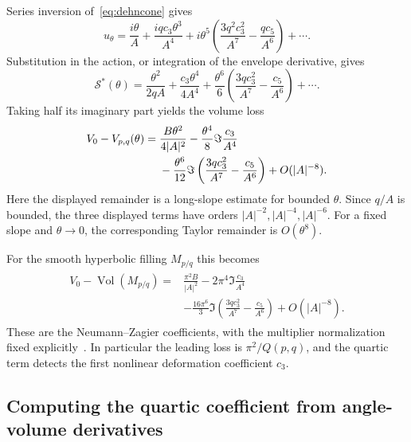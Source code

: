 \documentclass[11pt,a4paper]{article}
\numberwithin{equation}{section}
\theoremstyle{definition}
\theoremstyle{remark}
\DeclareMathOperator{\Vol}{Vol}
\begin{document}
Series inversion of~\eqref{eq:dehncone} gives
\begin{equation}
 u_\theta=\frac{i\theta}{A}
   +\frac{iqc_3\theta^3}{A^4}
   +i\theta^5\left(\frac{3q^2c_3^2}{A^7}
                         -\frac{qc_5}{A^6}\right)+\cdots.
 \label{eq:dehninversion}
\end{equation}
Substitution in the action, or integration of the envelope derivative,
gives
\begin{equation}
 \mathcal S^*(\theta)=\frac{\theta^2}{2qA}
  +\frac{c_3\theta^4}{4A^4}
  +\frac{\theta^6}{6}
       \left(\frac{3qc_3^2}{A^7}-\frac{c_5}{A^6}\right)+\cdots.
 \label{eq:dehncriticalseries}
\end{equation}
Taking half its imaginary part yields the volume loss
\begin{align}
 V_0-V_{p,q}(\theta)
 ={}&\frac{B\theta^2}{4|A|^2}
       -\frac{\theta^4}{8}\Im\frac{c_3}{A^4}\notag\\
    &-\frac{\theta^6}{12}
       \Im\left(\frac{3qc_3^2}{A^7}-\frac{c_5}{A^6}\right)
       +O(|A|^{-8}).
 \label{eq:dehnconeloss}
\end{align}
Here the displayed remainder is a long-slope estimate for bounded
$\theta$. Since $q/A$ is bounded, the three displayed terms have
orders $|A|^{-2},|A|^{-4},|A|^{-6}$. For a fixed slope and
$\theta\to0$, the corresponding Taylor remainder is $O(\theta^8)$.

For the smooth hyperbolic filling $M_{p/q}$ this becomes
\begin{align}
 \boxed{\begin{aligned}
 V_0-\Vol(M_{p/q})
 ={}&\frac{\pi^2B}{|A|^2}
       -2\pi^4\Im\frac{c_3}{A^4}\\
    &-\frac{16\pi^6}{3}
       \Im\left(\frac{3qc_3^2}{A^7}-\frac{c_5}{A^6}\right)
       +O(|A|^{-8}).
 \end{aligned}}
 \label{eq:dehnsmoothloss}
\end{align}
These are the Neumann--Zagier coefficients, with the multiplier
normalization fixed explicitly~\cite[Section 6]{NeumannZagier}.
In particular the leading loss is $\pi^2/Q(p,q)$, and the quartic
term detects the first nonlinear deformation coefficient $c_3$.

\subsection{Computing the quartic coefficient from angle-volume derivatives}
\end{document}
